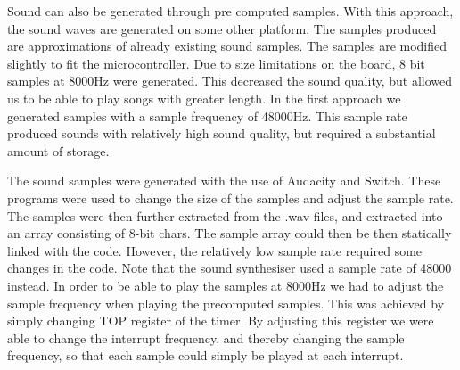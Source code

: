 
Sound can also be generated through pre computed samples. With this approach, the sound waves are generated on some other platform. The samples produced are approximations of already existing sound samples. The samples are modified slightly to fit the microcontroller. Due to size limitations on the board, 8 bit samples at 8000Hz were generated. This decreased the sound quality, but allowed us to be able to play songs with greater length. In the first approach we generated samples with a sample frequency of 48000Hz. This sample rate produced sounds with relatively high sound quality, but required a substantial amount of storage.

The sound samples were generated with the use of Audacity and Switch. These programs were used to change the size of the samples and adjust the sample rate. The samples were then further extracted from the .wav files, and extracted into an array consisting of 8-bit chars. The sample array could then be then statically linked with the code. However, the relatively low sample rate required some changes in the code. Note that the sound synthesiser used a sample rate of 48000 instead. In order to be able to play the samples at 8000Hz we had to adjust the sample frequency when playing the precomputed samples. This was achieved by simply changing TOP register of the timer. By adjusting this register we were able to change the interrupt frequency, and thereby changing the sample frequency, so that each sample could simply be played at each interrupt.  



  











